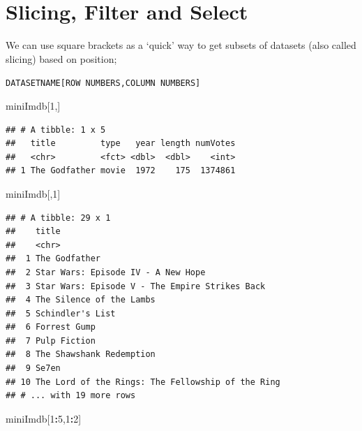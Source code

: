 \documentclass[]{book}
\newenvironment{Shaded}{\begin{snugshade}}{\end{snugshade}}
\newcommand{\DecValTok}[1]{\textcolor[rgb]{0.00,0.00,0.81}{#1}}
\newcommand{\NormalTok}[1]{#1}
\newcommand{\OperatorTok}[1]{\textcolor[rgb]{0.81,0.36,0.00}{\textbf{#1}}}
\begin{document}
\hypertarget{slicing-filter-and-select}{%
\section{Slicing, Filter and Select}\label{slicing-filter-and-select}}

We can use square brackets as a `quick' way to get subsets of datasets (also called slicing) based on position;

\texttt{DATASETNAME{[}ROW\ NUMBERS,COLUMN\ NUMBERS{]}}

\begin{Shaded}
\begin{Highlighting}[]
\NormalTok{miniImdb[}\DecValTok{1}\NormalTok{,]}
\end{Highlighting}
\end{Shaded}

\begin{verbatim}
## # A tibble: 1 x 5
##   title         type   year length numVotes
##   <chr>         <fct> <dbl>  <dbl>    <int>
## 1 The Godfather movie  1972    175  1374861
\end{verbatim}

\begin{Shaded}
\begin{Highlighting}[]
\NormalTok{miniImdb[,}\DecValTok{1}\NormalTok{]}
\end{Highlighting}
\end{Shaded}

\begin{verbatim}
## # A tibble: 29 x 1
##    title                                            
##    <chr>                                            
##  1 The Godfather                                    
##  2 Star Wars: Episode IV - A New Hope               
##  3 Star Wars: Episode V - The Empire Strikes Back   
##  4 The Silence of the Lambs                         
##  5 Schindler's List                                 
##  6 Forrest Gump                                     
##  7 Pulp Fiction                                     
##  8 The Shawshank Redemption                         
##  9 Se7en                                            
## 10 The Lord of the Rings: The Fellowship of the Ring
## # ... with 19 more rows
\end{verbatim}

\begin{Shaded}
\begin{Highlighting}[]
\NormalTok{miniImdb[}\DecValTok{1}\OperatorTok{:}\DecValTok{5}\NormalTok{,}\DecValTok{1}\OperatorTok{:}\DecValTok{2}\NormalTok{]}
\end{Highlighting}
\end{Shaded}
\end{document}
